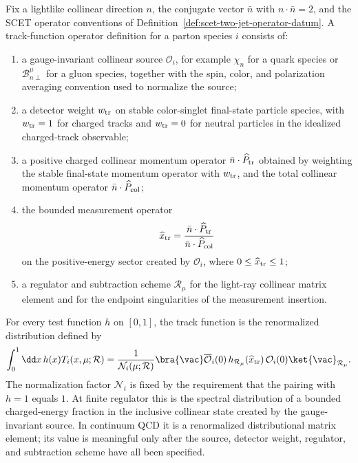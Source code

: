 \begin{definition}
\label{def:track-function-operator-datum}
Fix a lightlike collinear direction \(n\), the conjugate vector \(\bar n\)
with \(n\cdot\bar n=2\), and the SCET operator conventions of
Definition~\ref{def:scet-two-jet-operator-datum}.  A track-function operator
definition for a parton species \(i\) consists of:
\begin{enumerate}
  \item a gauge-invariant collinear source \(\mathcal O_i\), for example
  \(\chi_n\) for a quark species or
  \(\mathcal B_{n\perp}^{\mu}\) for a gluon species, together with the spin,
  color, and polarization averaging convention used to normalize the source;
  \item a detector weight \(w_{\rm tr}\) on stable color-singlet final-state
  particle species, with \(w_{\rm tr}=1\) for charged tracks and
  \(w_{\rm tr}=0\) for neutral particles in the idealized charged-track
  observable;
  \item a positive charged collinear momentum operator
  \(\bar n\cdot\widehat P_{\rm tr}\) obtained by weighting the stable
  final-state momentum operator with \(w_{\rm tr}\), and the total collinear
  momentum operator \(\bar n\cdot\widehat P_{\rm col}\);
  \item the bounded measurement operator
  \[
    \widehat x_{\rm tr}
    =
    \frac{\bar n\cdot\widehat P_{\rm tr}}
         {\bar n\cdot\widehat P_{\rm col}}
  \]
  on the positive-energy sector created by \(\mathcal O_i\), where
  \(0\leq \widehat x_{\rm tr}\leq1\);
  \item a regulator and subtraction scheme \(\mathcal R_\mu\) for the
  light-ray collinear matrix element and for the endpoint singularities of
  the measurement insertion.
\end{enumerate}
For every test function \(h\) on \([0,1]\), the track function is the
renormalized distribution defined by
\begin{equation}
  \int_0^1\dd x\,h(x)T_i(x,\mu;\mathcal R)
  =
  \frac{1}{\mathcal N_i(\mu;\mathcal R)}
  \bra{\vac}
  \overline{\mathcal O}_i(0)\,
  h_{\mathcal R_\mu}(\widehat x_{\rm tr})\,
  \mathcal O_i(0)
  \ket{\vac}_{\mathcal R_\mu}.
  \label{eq:track-function-test-pairing}
\end{equation}
The normalization factor \(\mathcal N_i\) is fixed by the requirement that
the pairing with \(h=1\) equals \(1\).  At finite regulator this is the
spectral distribution of a bounded charged-energy fraction in the inclusive
collinear state created by the gauge-invariant source.  In continuum QCD it
is a renormalized distributional matrix element; its value is meaningful only
after the source, detector weight, regulator, and subtraction scheme have
all been specified.
\end{definition}


